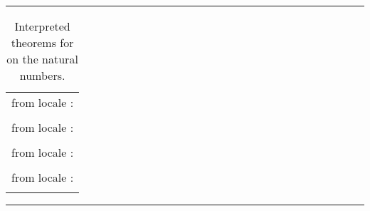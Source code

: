 \begin{isabellebody}
\begin{isamarkuptext}
\begin{table}
\hrule
\vspace{2ex}
\begin{center}
\begin{tabular}{l}
  \isa{nat{\isachardot}less{\isacharunderscore}def} from locale \isa{partial{\isacharunderscore}order}: \\
  \quad \isa{{\isacharparenleft}{\isacharquery}x\ {\isacharless}\ {\isacharquery}y{\isacharparenright}\ {\isacharequal}\ {\isacharparenleft}{\isacharquery}x\ {\isasymle}\ {\isacharquery}y\ {\isasymand}\ {\isacharquery}x\ {\isasymnoteq}\ {\isacharquery}y{\isacharparenright}} \\
  \isa{nat{\isachardot}meet{\isacharunderscore}left} from locale \isa{lattice}: \\
  \quad \isa{min\ {\isacharquery}x\ {\isacharquery}y\ {\isasymle}\ {\isacharquery}x} \\
  \isa{nat{\isachardot}join{\isacharunderscore}distr} from locale \isa{distrib{\isacharunderscore}lattice}: \\
  \quad \isa{max\ {\isacharquery}x\ {\isacharparenleft}min\ {\isacharquery}y\ {\isacharquery}z{\isacharparenright}\ {\isacharequal}\ min\ {\isacharparenleft}max\ {\isacharquery}x\ {\isacharquery}y{\isacharparenright}\ {\isacharparenleft}max\ {\isacharquery}x\ {\isacharquery}z{\isacharparenright}} \\
  \isa{nat{\isachardot}less{\isacharunderscore}total} from locale \isa{total{\isacharunderscore}order}: \\
  \quad \isa{{\isacharquery}x\ {\isacharless}\ {\isacharquery}y\ {\isasymor}\ {\isacharquery}x\ {\isacharequal}\ {\isacharquery}y\ {\isasymor}\ {\isacharquery}y\ {\isacharless}\ {\isacharquery}x}
\end{tabular}
\end{center}
\hrule
\caption{Interpreted theorems for \isa{{\isasymle}} on the natural numbers.}
\label{tab:nat-lattice}
\end{table}


\end{isamarkuptext}
\end{isabellebody}
